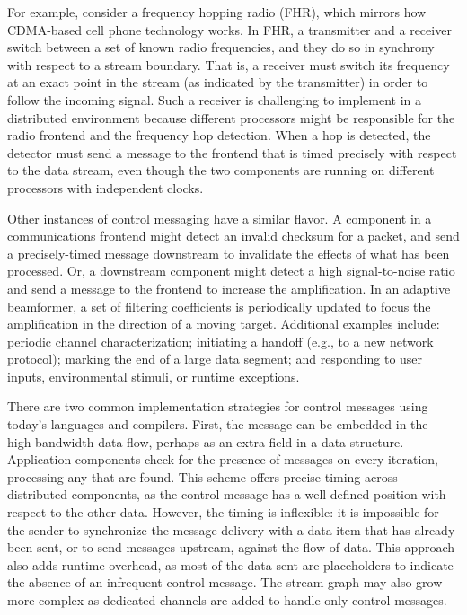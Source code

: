 For example, consider a frequency hopping radio (FHR), which mirrors
how CDMA-based cell phone technology works.  In FHR, a transmitter and
a receiver switch between a set of known radio frequencies, and they
do so in synchrony with respect to a stream boundary. That is, a
receiver must switch its frequency at an exact point in the stream (as
indicated by the transmitter) in order to follow the incoming signal.
Such a receiver is challenging to implement in a distributed
environment because different processors might be responsible for the
radio frontend and the frequency hop detection.  When a hop is
detected, the detector must send a message to the frontend that is
timed precisely with respect to the data stream, even though the two
components are running on different processors with independent
clocks.

Other instances of control messaging have a similar flavor.  A
component in a communications frontend might detect an invalid
checksum for a packet, and send a precisely-timed message downstream
to invalidate the effects of what has been processed.  Or, a
downstream component might detect a high signal-to-noise ratio and
send a message to the frontend to increase the amplification.  In an
adaptive beamformer, a set of filtering coefficients is periodically
updated to focus the amplification in the direction of a moving
target.  Additional examples include: periodic channel
characterization; initiating a handoff (e.g., to a new network
protocol); marking the end of a large data segment; and responding to
user inputs, environmental stimuli, or runtime exceptions.

There are two common implementation strategies for control messages
using today's languages and compilers.  First, the message can be
embedded in the high-bandwidth data flow, perhaps as an extra field in
a data structure.  Application components check for the presence of
messages on every iteration, processing any that are found.  This
scheme offers precise timing across distributed components, as the
control message has a well-defined position with respect to the other
data.  However, the timing is inflexible: it is impossible for the
sender to synchronize the message delivery with a data item that has
already been sent, or to send messages upstream, against the flow of
data.  This approach also adds runtime overhead, as most of the data
sent are placeholders to indicate the absence of an infrequent control
message.  The stream graph may also grow more complex as dedicated
channels are added to handle only control messages.

